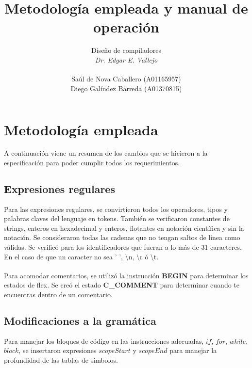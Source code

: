 \documentclass[11pt]{article}
\begin{document}
\title{Metodología empleada y manual de operación}
\author{
    \Large Diseño de compiladores
    \\
    \textit{Dr. Edgar E. Vallejo}
    \\
    \\
    Saúl de Nova Caballero (A01165957)
    \\
    Diego Galíndez Barreda (A01370815)
}
\maketitle

\section{Metodología empleada}

A continuación viene un resumen de los cambios que se hicieron a la especificación para poder cumplir todos los requerimientos.

\subsection{Expresiones regulares}

Para las expresiones regulares, se convirtieron todos los operadores, tipos y palabras claves del lenguaje en tokens. También 
se verificaron constantes de strings, enteros en hexadecimal y enteros, flotantes en notación científica y sin la notación. 
Se consideraron todas las cadenas que no tengan saltos de línea como válidas. Se verificó para los identificadores que fueran 
a lo más de 31 caracteres. En el caso de que un caracter no sea ' ', \textbackslash n, \textbackslash r ó \textbackslash t.
\\\\
Para acomodar comentarios, se utilizó la instrucción \textbf{BEGIN} para determinar los estados de flex. Se creó el estado 
\textbf{C\_COMMENT} para determinar cuando te encuentras dentro de un comentario.

\subsection{Modificaciones a la gramática}

Para manejar los bloques de código en las instrucciones adecuadas, $if$, $for$, $while$, $block$, se insertaron expresiones $scopeStart$ y $scopeEnd$ para manejar la profundidad de las tablas de símbolos.
\end{document}
